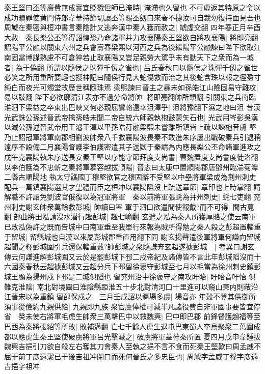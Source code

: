 秦王堅曰丕等廣費無成實宜貶戮但師已淹時|{
	淹滯也久留也}
不可虛返其特原之令以成功贖罪使黄門侍郎韋華持節切讓丕等賜丕劔曰來春不捷汝可自裁勿復持面見吾也　周虓在秦密與桓冲書言秦陰計又逃奔漢中秦人獲而赦之|{
	虓虛交翻}
四年春正月辛酉大赦　秦長樂公丕等得詔惶恐乃命諸軍并力攻襄陽秦王堅欲自將攻襄陽|{
	將即亮翻}
詔陽平公融以關東六州之兵會壽春梁熙以河西之兵為後繼陽平公融諫曰陛下欲取江南固當博謀熟慮不可倉猝若止取襄陽又豈足親勞大駕乎未有動天下之衆而為一城者|{
	為于偽翻}
所謂以隨侯之珠彈千仭之雀也|{
	呂氏春秋曰以隨侯之珠彈千仭之雀世必笑之所用重所要輕也搜神記曰隨侯行見大蛇傷救而治之其後蛇含珠以報之徑盈寸純白而夜光可燭堂故歷世稱隨珠焉}
梁熙諫曰晉主之暴未如孫皓江山險固易守難攻|{
	易以䜴翻}
陛下必欲廓清江表亦不過分命將帥|{
	將即亮翻帥所類翻}
引關東之兵南臨淮泗下梁益之卒東出巴峽又何必親屈鸞輅遠幸沮澤乎|{
	沮將豫翻下濕之地曰沮}
昔漢光武誅公孫述晉武帝擒孫皓未聞二帝自統六師親執枹鼓蒙矢石也|{
	光武用岑彭吳漢以滅公孫述晉武帝用王濬王渾以平孫皓苻融梁熙未嘗離所鎮皆上疏以諫枹音膚}
堅乃止詔冠軍將軍南郡相劉波帥衆八千救襄陽波畏秦不敢進朱序屢出戰破秦兵引退稍遠序不設備二月襄陽督護李伯護密遣其子送欵于秦請為内應長樂公丕命諸軍進攻之戊午克襄陽執朱序送長安秦王堅以序能守節拜度支尚書|{
	曹魏置度支尚書度徙洛翻}
以李伯護為不忠斬之秦將軍慕容越拔順陽|{
	晉志曰太康中置順陽郡唐鄧州臨湍菊潭二縣古順陽地}
執太守譙國丁穆堅欲官之穆固辭不受堅以中壘將軍梁成為荆州刺史配兵一萬鎮襄陽選其才望禮而臣之桓冲以襄陽䧟沒上疏送章節|{
	章印也上時掌翻}
請解職不許詔免劉波官俄復以為冠軍將軍　秦以前將軍張蚝為并州刺史|{
	蚝七吏翻}
兖州刺史謝玄帥衆萬餘救彭城|{
	帥讀曰率}
軍于泗口欲遣間使報戴?而不可得|{
	間古莧翻}
部曲將田泓請沒水潜行趣彭城|{
	趣七喻翻}
玄遣之泓為秦人所獲厚賂之使云南軍已敗泓偽許之既而告城中曰南軍垂至我單行來報為賊所得勉之秦人殺之彭超置輜重于留城|{
	留縣城也自漢以來屬彭城郡重直用翻下同}
謝玄揚聲遣後軍將軍何謙向留城超聞之釋彭城圍引兵還保輜重戴?帥彭城之衆隨謙奔玄超遂據彭城　|{
	考異曰謝玄傳云何謙進解彭城圍又云於是罷彭城下邳二戍帝紀及諸傳皆不言此年彭城䧟沒而十六國秦春秋云超據彭城又云超分兵下邳留徐褒守彭城至七月以毛當為徐州刺史鎮彭城王顯為揚州戍下邳是二城俱䧟也}
留兖州治中徐褒守之南攻盱眙|{
	盱眙音吁怡}
俱難克淮陰|{
	南北對境圖曰淮陰縣距淮五十步北對清河口十里進可以窺山東内則蔽沿江晉宋以為重鎮}
留邵保戍之　三月壬戌詔以疆場多虞|{
	場音亦}
年穀不登其供御所須事從儉約九親供給|{
	九親即九族}
衆官廩俸權可減半凡諸役費自非軍國事要皆宜停省　癸未使右將軍毛虎生帥衆三萬擊巴中以救魏興|{
	巴中即巴郡}
前鋒督護趙福等至巴西為秦將張紹等所敗|{
	敗補邁翻}
亡七千餘人虎生退屯巴東蜀人李烏聚衆二萬圍成都以應虎生秦王堅使破虜將軍呂光擊滅之|{
	破虜將軍蓋苻秦所置}
夏四月戊申韋鍾拔魏興吉挹引刀欲自殺左右奪其刀會秦人至執之挹不言不食而死秦王堅歎曰周孟威不屈于前丁彦遠潔已于後吉祖冲閉口而死何晉氏之多忠臣也|{
	周虓字孟威丁穆字彦遠吉挹字祖冲}
